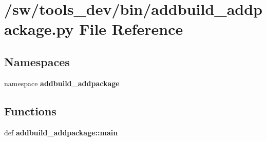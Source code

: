 \section{/sw/tools\_\-dev/bin/addbuild\_\-addpackage.py File Reference}
\label{addbuild__addpackage_8py}
\subsection*{Namespaces}
\begin{CompactItemize}
\item 
namespace {\bf addbuild\_\-addpackage}
\end{CompactItemize}
\subsection*{Functions}
\begin{CompactItemize}
\item 
def {\bf addbuild\_\-addpackage::main}
\end{CompactItemize}
